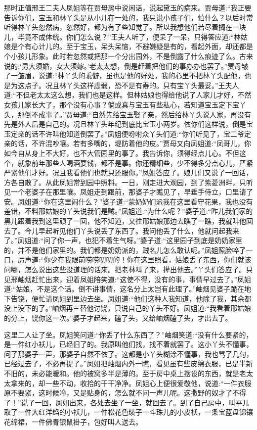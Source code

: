 \begin{parag}
    那时正值邢王二夫人凤姐等在贾母房中说闲话，说起黛玉的病来。贾母道:“我正要告诉你们，宝玉和林丫头是从小儿在一处的，我只说小孩子们，怕什么？以后时常听得林丫头忽然病，忽然好，都为有了些知觉了。所以我想他们若尽着搁在一块儿，毕竟不成体统。你们怎么说？”王夫人听了，便呆了一呆，只得答应道:“林姑娘是个有心计儿的。至于宝玉，呆头呆恼，不避嫌疑是有的，看起外面，却还都是个小孩儿形象。此时若忽然或把那一个分出园外，不是倒露了什么痕迹了么。古来说的:‘男大须婚，女大须嫁。’老太太想，倒是赶着把他们的事办办也罢了。”贾母皱了一皱眉，说道:“林丫头的乖僻，虽也是他的好处，我的心里不把林丫头配他，也是为这点子。况且林丫头这样虚弱，恐不是有寿的。只有宝丫头最妥。”王夫人道:“不但老太太这么想，我们也是这样。但林姑娘也得给他说了人家儿才好，不然女孩儿家长大了，那个没有心事？倘或真与宝玉有些私心，若知道宝玉定下宝丫头，那倒不成事了。”贾母道:“自然先给宝玉娶了亲，然后给林丫头说人家，再没有先是外人后是自己的。况且林丫头年纪到底比宝玉小两岁。依你们这样说，倒是宝玉定亲的话不许叫他知道倒罢了。”凤姐便吩咐众丫头们道:“你们听见了，宝二爷定亲的话，不许混吵嚷。若有多嘴的，堤防着他的皮。”贾母又向凤姐道:“凤哥儿，你如今自从身上不大好，也不大管园里的事了。我告诉你，须得经点儿心。不但这个，就象前年那些人喝酒耍钱，都不是事。你还精细些，少不得多分点心儿，严紧严紧他们才好。况且我看他们也就只还服你。”凤姐答应了。娘儿们又说了一回话，方各自散了。从此凤姐常到园中照料。一日，刚走进大观园，到了紫菱洲畔，只听见一个老婆子在那里嚷。凤姐走到跟前，那婆子才瞧见了，早垂手侍立，口里请了安。凤姐道:“你在这里闹什么？”婆子道:“蒙奶奶们派我在这里看守花果，我也没有差错，不料邢姑娘的丫头说我们是贼。”凤姐道:“为什么呢？”婆子道:“昨儿我们家的黑儿跟着我到这里顽了一回，他不知道，又往邢姑娘那边去瞧了一瞧，我就叫他回去了。今儿早起听见他们丫头说丢了东西了。我问他丢了什么，他就问起我来了。”凤姐道:“问了你一声，也犯不着生气呀。”婆子道:“这里园子到底是奶奶家里的，并不是他们家里的。我们都是奶奶派的，贼名儿怎么敢认呢。”凤姐照脸啐了一口，厉声道:“你少在我跟前唠唠叨叨的！你在这里照看，姑娘丢了东西，你们就该问哪，怎么说出这些没道理的话来。把老林叫了来，撵出他去。”丫头们答应了。只见邢岫烟赶忙出来，迎着凤姐陪笑道:“这使不得，没有的事，事情早过去了。”凤姐道:“姑娘，不是这个话。倒不讲事情，这名分上太岂有此理了。”岫烟见婆子跪在地下告饶，便忙请凤姐到里边去坐。凤姐道:“他们这种人我知道，他除了我，其余都没上没下的了。”岫烟再三替他讨饶，只说自己的丫头不好。凤姐道:“我看着邢姑娘的分上，饶你这一次。”婆子才起来，磕了头，又给岫烟磕了头，才出去了。
\end{parag}


\begin{parag}
    这里二人让了坐。凤姐笑问道:“你丢了什么东西了？”岫烟笑道:“没有什么要紧的，是一件红小袄儿，已经旧了的。我原叫他们找，找不着就罢了。这小丫头不懂事，问了那婆子一声，那婆子自然不依了。这都是小丫头糊涂不懂事，我也骂了几句，已经过去了，不必再提了。”凤姐把岫烟内外一瞧，看见虽有些皮绵衣服，已是半新不旧的，未必能暖和。他的被窝多半是薄的。至于房中桌上摆设的东西，就是老太太拿来的，却一些不动，收拾的干干净净。凤姐心上便很爱敬他，说道:“一件衣服原不要紧，这时候冷，又是贴身的，怎么就不问一声儿呢。这撒野的奴才了不得了！”说了一回，凤姐出来，各处去坐了一坐，就回去了。到了自己房中，叫平儿取了一件大红洋绉的小袄儿，一件松花色绫子一斗珠儿的小皮袄，一条宝蓝盘锦镶花绵裙，一件佛青银鼠褂子，包好叫人送去。
\end{parag}


